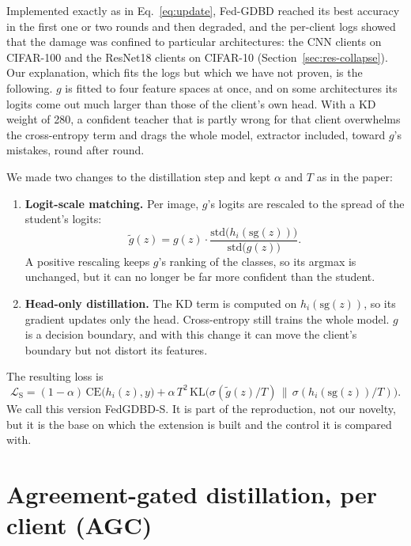 Implemented exactly as in Eq.~\eqref{eq:update}, Fed-GDBD reached its best accuracy in the first one or two rounds and then degraded, and the per-client logs showed that the damage was confined to particular architectures: the CNN clients on CIFAR-100 and the ResNet18 clients on CIFAR-10 (Section~\ref{sec:res-collapse}). Our explanation, which fits the logs but which we have not proven, is the following. $g$ is fitted to four feature spaces at once, and on some architectures its logits come out much larger than those of the client's own head. With a KD weight of 280, a confident teacher that is partly wrong for that client overwhelms the cross-entropy term and drags the whole model, extractor included, toward $g$'s mistakes, round after round.

We made two changes to the distillation step and kept $\alpha$ and $T$ as in the paper:
\begin{enumerate}
\item \textbf{Logit-scale matching.} Per image, $g$'s logits are rescaled to the spread of the student's logits:
\begin{equation}
\tilde{g}(z) = g(z) \cdot \frac{\mathrm{std}\big(h_i(\mathrm{sg}(z))\big)}{\mathrm{std}\big(g(z)\big)} .
\label{eq:scale}
\end{equation}
A positive rescaling keeps $g$'s ranking of the classes, so its argmax is unchanged, but it can no longer be far more confident than the student.
\item \textbf{Head-only distillation.} The KD term is computed on $h_i(\mathrm{sg}(z))$, so its gradient updates only the head. Cross-entropy still trains the whole model. $g$ is a decision boundary, and with this change it can move the client's boundary but not distort its features.
\end{enumerate}
The resulting loss is
\begin{equation}
\mathcal{L}_{\text{S}} = (1-\alpha)\,\mathrm{CE}\big(h_i(z), y\big) + \alpha\, T^2\, \mathrm{KL}\big(\sigma(\tilde{g}(z)/T) \,\big\|\, \sigma(h_i(\mathrm{sg}(z))/T)\big).
\label{eq:fgs}
\end{equation}
We call this version FedGDBD-S. It is part of the reproduction, not our novelty, but it is the base on which the extension is built and the control it is compared with.

\section{Agreement-gated distillation, per client (AGC)}
\label{sec:m-agc}

